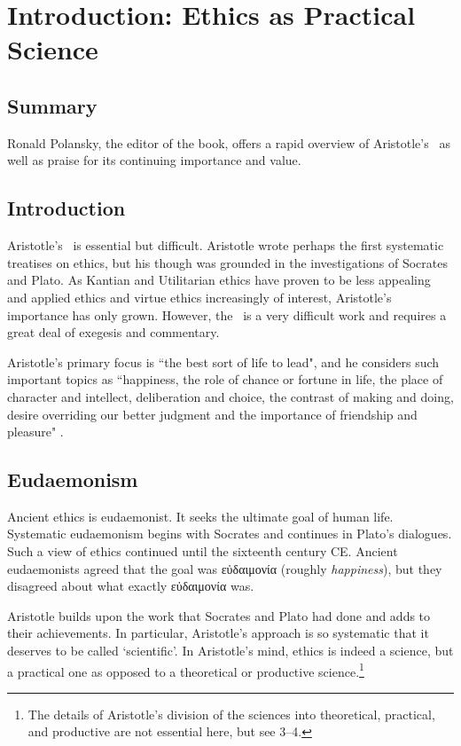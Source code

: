 \chapter*{Introduction: Ethics as Practical Science}

\section*{Summary}
Ronald Polansky, the editor of the book, offers a rapid overview of
Aristotle's \NE\ as well as praise for its continuing importance and value.

\section*{Introduction}

Aristotle's \NE\ is essential but difficult.  Aristotle wrote perhaps the first
systematic treatises on ethics, but his though was grounded in the
investigations of Socrates and Plato.  As Kantian and Utilitarian ethics have
proven to be less appealing and applied ethics and virtue ethics increasingly
of interest, Aristotle's importance has only grown. However, the \NE\ is a very
difficult work and requires a great deal of exegesis and commentary.

Aristotle's  primary focus is ``the best sort of life to lead", and he
considers such important topics as ``happiness, the role of chance or fortune
in life, the place of character and intellect, deliberation and choice, the
contrast of making and doing, desire overriding our better judgment and the
importance of friendship and pleasure" \citep[1]{polansky2014a}.

\section*{Eudaemonism}

Ancient ethics is eudaemonist.  It seeks the ultimate goal of human life.
Systematic eudaemonism begins with Socrates and continues in Plato's dialogues.  Such a view of ethics continued until the sixteenth century CE.  Ancient
eudaemonists agreed that the goal was εὐδαιμονία (roughly \textit{happiness}),
but they disagreed about what exactly εὐδαιμονία was.

Aristotle builds upon the work that Socrates and Plato had done and adds to
their achievements.  In particular, Aristotle's approach is so systematic that
it deserves to be called `scientific'.  In Aristotle's mind, ethics is indeed
a science, but a practical one as opposed to a theoretical or productive
science.\footnote{The details of Aristotle's division of the sciences into
theoretical, practical, and productive are not essential here, but see
\citet{polansky2014a} 3--4.}

